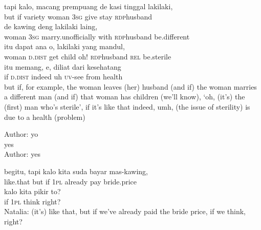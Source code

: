 \ea
\gll   tapi    {kalo,}    {macang}    {prempuang}    {de}    {kasi}    {tinggal}    {laki{\Tilde}laki,}\\
  but    {if}    {variety}    {woman}    {\textsc{3sg}}    {give}    {stay}    {\textsc{rdp}{\Tilde}husband}\\
    {de}    {kawing}    {deng}    {laki{\Tilde}laki}    {laing,}\\
   {woman}    {\textsc{3sg}}    {marry.unofficially}    {with}    {\textsc{rdp}{\Tilde}husband}    {be.different}\\
    {itu}    {dapat}    {ana}    {o,}    {laki{\Tilde}laki}    {yang}   mandul,\\
   {woman}    {\textsc{d.dist}}    {get}    {child}    {oh!}    {\textsc{rdp}{\Tilde}husband}    {\textsc{rel}}   be.sterile\\
    {itu}    {memang,}    {e,}    {diliat}    {dari}    {kesehatang}\\
   {if}    {\textsc{d.dist}}    {indeed}    {uh}    {\textsc{uv}{}-see}    {from}    {health}\\
\glt
but if, for example, the woman leaves (her) husband (and if) the woman marries a different man (and if) that woman has children (we’ll know), ‘oh, (it’s) the (first) man who’s sterile’, if it’s like that indeed, umh, (the issue of sterility) is due to a health (problem)
\z

\ea
\gll   Author:   yo\\
{} yes\\
\glt
Author: yes
\z

\ea
{}    {begitu,}   tapi   kalo   kita   suda   bayar   mas-kawing,\\
   {}    {like.that}   but   if   \textsc{1pl}   already   pay   bride.price\\
\gll  kalo    {kita}   pikir    {to?}\\
  if    {\textsc{1pl}}   think    {right?}\\
\glt
Natalia: (it’s) like that, but if we’ve already paid the bride price, if we think, right?
\z

